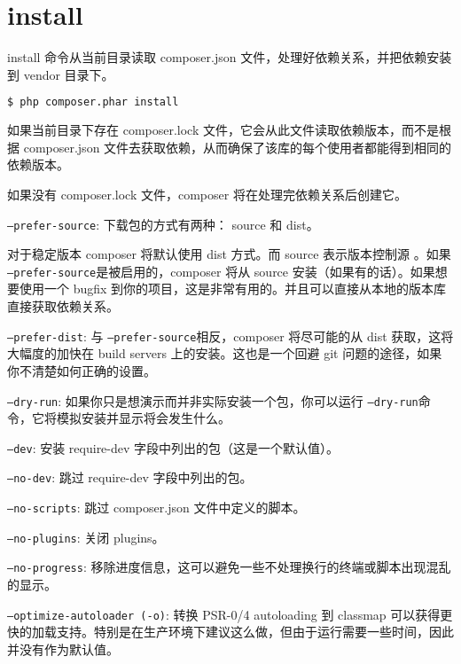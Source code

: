 \section{install}

install 命令从当前目录读取 composer.json 文件，处理好依赖关系，并把依赖安装到 vendor 目录下。


\begin{lstlisting}[language=bash]
$ php composer.phar install
\end{lstlisting}

如果当前目录下存在 composer.lock 文件，它会从此文件读取依赖版本，而不是根据 composer.json 文件去获取依赖，从而确保了该库的每个使用者都能得到相同的依赖版本。

如果没有 composer.lock 文件，composer 将在处理完依赖关系后创建它。

\begin{compactitem}
\item \texttt{--prefer-source}: 下载包的方式有两种： source 和 dist。

对于稳定版本 composer 将默认使用 dist 方式。而 source 表示版本控制源 。如果 \texttt{--prefer-source}是被启用的，composer 将从 source 安装（如果有的话）。如果想要使用一个 bugfix 到你的项目，这是非常有用的。并且可以直接从本地的版本库直接获取依赖关系。
\item \texttt{--prefer-dist}: 与 \texttt{--prefer-source}相反，composer 将尽可能的从 dist 获取，这将大幅度的加快在 build servers 上的安装。这也是一个回避 git 问题的途径，如果你不清楚如何正确的设置。
\item \texttt{--dry-run}: 如果你只是想演示而并非实际安装一个包，你可以运行 \texttt{--dry-run}命令，它将模拟安装并显示将会发生什么。
\item \texttt{--dev}: 安装 require-dev 字段中列出的包（这是一个默认值）。
\item \texttt{--no-dev}: 跳过 require-dev 字段中列出的包。
\item \texttt{--no-scripts}: 跳过 composer.json 文件中定义的脚本。
\item \texttt{--no-plugins}: 关闭 plugins。
\item \texttt{--no-progress}: 移除进度信息，这可以避免一些不处理换行的终端或脚本出现混乱的显示。
\item \texttt{--optimize-autoloader (-o)}: 转换 PSR-0/4 autoloading 到 classmap 可以获得更快的加载支持。特别是在生产环境下建议这么做，但由于运行需要一些时间，因此并没有作为默认值。
\end{compactitem}



